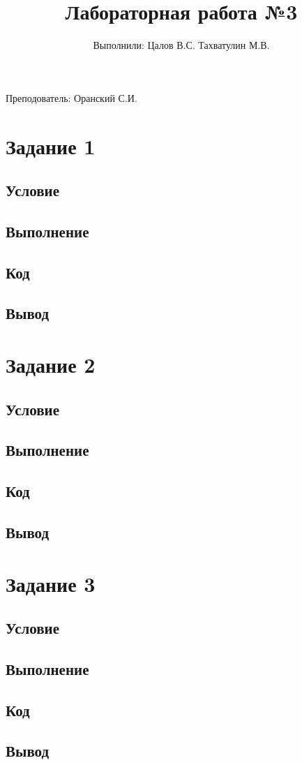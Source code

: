 \documentclass{article}
\title{Лабораторная работа №3}
\author{Выполнили: Цалов В.С. Тахватулин М.В.}
\begin{document}
\maketitle
\begin{center}
      {\fontsize{14}{15}\selectfont
            Преподователь: Оранский С.И.
      }
\end{center}
\section{Задание 1}
\subsection{Условие}
\subsection{Выполнение}
\subsection{Код}
\subsection{Вывод}


\section{Задание 2}
\subsection{Условие}
\subsection{Выполнение}
\subsection{Код}
\subsection{Вывод}


\section{Задание 3}
\subsection{Условие}
\subsection{Выполнение}
\subsection{Код}
\subsection{Вывод}
\end{document}
